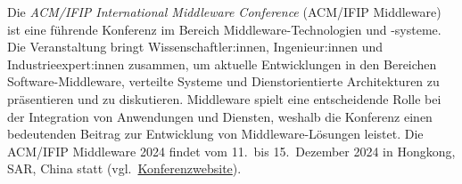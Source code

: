 Die \emph{ACM/IFIP International Middleware Conference} (ACM/IFIP Middleware) ist eine führende Konferenz im Bereich Middleware-Technologien und -systeme.
Die Veranstaltung bringt Wissenschaftler:innen, Ingenieur:innen und Industrieexpert:innen zusammen, um aktuelle Entwicklungen in den Bereichen Software-Middleware, verteilte Systeme und Dienstorientierte Architekturen zu präsentieren und zu diskutieren.
Middleware spielt eine entscheidende Rolle bei der Integration von Anwendungen und Diensten, weshalb die Konferenz einen bedeutenden Beitrag zur Entwicklung von Middleware-Lösungen leistet.
Die ACM/IFIP Middleware 2024 findet vom 11.~bis 15.~Dezember 2024 in Hongkong, SAR, China statt (vgl.~\href{https://middleware-conf.github.io/2024/}{Konferenzwebsite}).



% 



